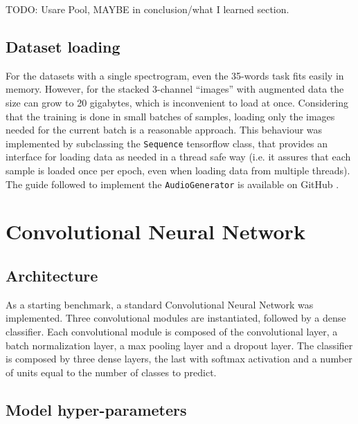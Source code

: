 
TODO: Usare Pool, MAYBE in conclusion/what I learned section.


\subsection{Dataset loading}


For the datasets with a single spectrogram, even the 35-words task fits easily
in memory. However, for the stacked 3-channel ``images'' with augmented data
the size can grow to 20 gigabytes, which is inconvenient to load at once.
Considering that the training is done in small batches of samples, loading only
the images needed for the current batch is a reasonable approach.
This behaviour was implemented by subclassing the \texttt{Sequence} tensorflow
class, that provides an interface for loading data as needed in a thread safe
way (i.e. it assures that each sample is loaded once per epoch, even when
loading data from multiple threads).
The guide followed to implement the \texttt{AudioGenerator} is available on 
GitHub \cite{afshineaKDG}.

\section{Convolutional Neural Network}
\label{sec:convolutional_arch}

\subsection{Architecture}

As a starting benchmark, a standard Convolutional Neural Network was implemented.
Three convolutional modules are instantiated, followed by a dense classifier.
Each convolutional module is composed of the convolutional layer, a batch
normalization layer, a max pooling layer and a dropout layer.
The classifier is composed by three dense layers, the last with softmax
activation and a number of units equal to the number of classes to predict.

\subsection{Model hyper-parameters}

